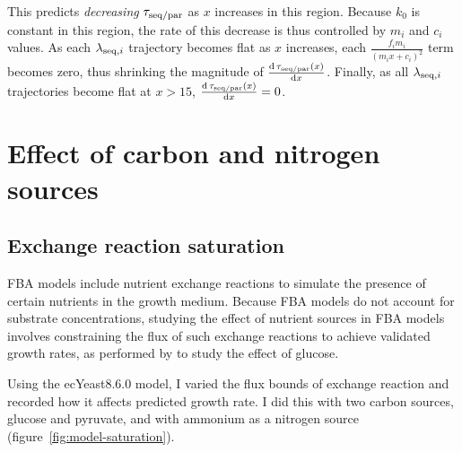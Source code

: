 This predicts \emph{decreasing} $\tau_{\mathrm{seq}/\mathrm{par}}$ as $x$ increases in this region.
Because $k_{0}$ is constant in this region, the rate of this decrease is thus controlled by $m_{i}$ and $c_{i}$ values.
As each $\lambda_{\mathrm{seq},i}$ trajectory becomes flat as $x$ increases, each $\frac{f_{i}m_{i}}{(m_{i}x+c_{i})^{2}}$ term becomes zero, thus shrinking the magnitude of $\frac{\mathrm{d} \, \tau_{\mathrm{seq}/\mathrm{par}}(x)}{\mathrm{d} x}$.
Finally, as all $\lambda_{\mathrm{seq},i}$ trajectories become flat at $x > 15$, $\frac{\mathrm{d} \, \tau_{\mathrm{seq}/\mathrm{par}}(x)}{\mathrm{d} x} = 0$.


\section{Effect of carbon and nitrogen sources}
\label{sec:model-exchange}

\subsection{Exchange reaction saturation}
\label{subsec:model-saturation}

FBA models include nutrient exchange reactions to simulate the presence of certain nutrients in the growth medium.
Because FBA models do not account for substrate concentrations, studying the effect of nutrient sources in FBA models involves constraining the flux of such exchange reactions to achieve validated growth rates, as performed by \textcite{elsemmanWholecellModelingYeast2022} to study the effect of glucose.

Using the ecYeast8.6.0 model, I varied the flux bounds of exchange reaction and recorded how it affects predicted growth rate.
I did this with two carbon sources, glucose and pyruvate, and with ammonium as a nitrogen source (figure~\ref{fig:model-saturation}).

